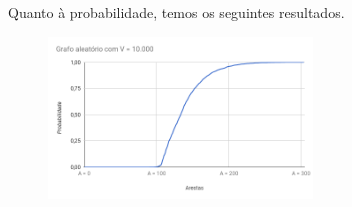 \documentclass[12pt,letterpaper]{article}
\begin{document}
Quanto à probabilidade, temos os seguintes resultados.

\begin{figure}[H]
\end{figure}

\begin{figure}[H]
\end{figure}

\begin{figure}[H]
\includegraphics[width=7cm]{chart-10000.png}
\centering
\end{figure}
\end{document}
